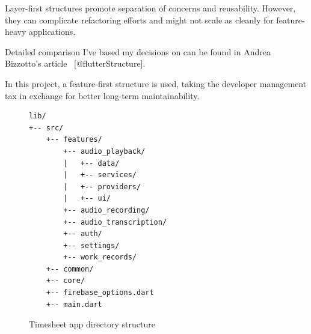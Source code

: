 \documentclass[
  digital,     %
  oneside,     %
  nosansbold,  %
  nocolorbold, %
  lof,         %
  lot,         %
]{fithesis4}
\begin{document}
\begin{markdown}

Layer-first structures promote separation of concerns and reusability.  
However, they can complicate refactoring efforts and might not scale as cleanly for feature-heavy applications.

Detailed comparison I've based my decisions on can be found in Andrea Bizzotto's article ~[@flutterStructure].

In this project, a feature-first structure is used, taking the developer management tax in exchange for better long-term maintainability.

\end{markdown}
\begin{figure}[ht]
  \begin{center}
    \begin{minipage}{.8\textwidth}
      \begin{verbatim}
lib/
+-- src/
    +-- features/
        +-- audio_playback/
        |   +-- data/
        |   +-- services/
        |   +-- providers/
        |   +-- ui/
        +-- audio_recording/
        +-- audio_transcription/
        +-- auth/
        +-- settings/
        +-- work_records/
    +-- common/
    +-- core/
    +-- firebase_options.dart
    +-- main.dart
      \end{verbatim}
    \end{minipage}
  \end{center}
  \caption{Timesheet app directory structure}
  \label{fig:project_directory_timesheet}
\end{figure}
\end{document}
